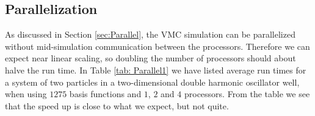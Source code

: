 \documentclass[../main.tex]{subfiles}
\begin{document}

\subsection{Parallelization}

As discussed in Section \ref{sec:Parallel}, the VMC simulation can be parallelized without mid-simulation communication between the processors. Therefore we can expect near linear scaling, so doubling the number of processors should about halve the run time. In Table \ref{tab: Parallel1} we have listed average run times for a system of two particles in a two-dimensional double harmonic oscillator well, when using $1275$ basis functions and $1$, $2$ and $4$ processors. From the table we see that the speed up is close to what we expect, but not quite. 
\end{document}
